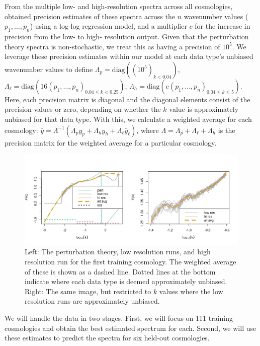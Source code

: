 \documentclass[11pt]{article}
\begin{document}
From the multiple low- and high-resolution spectra across all cosmologies, \cite{moran2023mira} obtained precision estimates of these spectra across the $n$ wavenumber values ($p_1,\dots,p_n$) using a log-log regression model, and a multiplier $c$ for the increase in precision from the low- to high- resolution output. Given that the perturbation theory spectra is non-stochastic, we treat this as having a precision of $10^5$. We leverage these precision estimates within our model at each data type's unbiased wavenumber values to define $\Lambda_p = \text{diag}\left((10^5)_{k < 0.04}\right)$, $\Lambda_{\ell} = \text{diag}\left(16(p_1,\dots,p_n)_{0.04 \leq k < 0.25}\right)$, $\Lambda_h = \text{diag}\left(c(p_1,\dots,p_n)_{0.04 \leq k \leq 5}\right)$. Here, each precision matrix is diagonal and the diagonal elements consist of the precision values or zero, depending on whether the $k$ value is approximately unbiased for that data type. With this, we calculate a weighted average for each cosmology: $\bar y = \Lambda^{-1}(\Lambda_p y_p + \Lambda_h y_h + \Lambda_{\ell} \bar{y}_\ell)$, where $\Lambda = \Lambda_p + \Lambda_\ell + \Lambda_h$ is the precision matrix for the weighted average for a particular cosmology.

\begin{figure}[ht]
    \centering
    \includegraphics[width=6in]{plot_data.png}
    \caption{Left: The perturbation theory, low resolution runs, and high resolution run for the first training cosmology. The weighted average of these is shown as a dashed line. Dotted lines at the bottom indicate where each data type is deemed approximately unbiased. Right: The same image, but restricted to $k$ values where the low resolution runs are approximately unbiased.}
    \label{fig:plot_data}
\end{figure}

We will handle the data in two stages.  First, we will focus on 111 training cosmologies and obtain the best estimated spectrum for each.  Second, we will use these estimates to predict the spectra for six held-out cosmologies.
\end{document}
